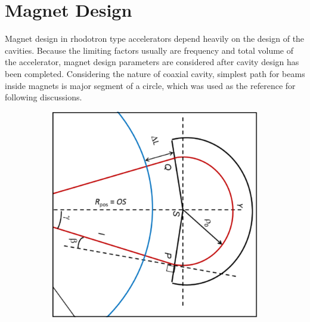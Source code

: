\documentclass[a4paper,oneside,12pt]{report}
\numberwithin{equation}{chapter}
\begin{document}
\section{Magnet Design} \label{sec:magnet_design}
Magnet design in rhodotron type accelerators depend heavily on the design of the cavities.
Because the limiting factors usually are frequency and total volume of the accelerator, magnet design parameters are considered after cavity design has been completed.
Considering the nature of coaxial cavity, simplest path for beams inside magnets is major segment of a circle, which was used as the reference for following discussions.
\iffalse \begin{figure}[H]
    \centering
    \begin{subfigure}{.5\textwidth}
      \centering
      \includegraphics[width=.9\linewidth]{./figures/design/Ltot.png}
    \end{subfigure}%
    \centering
    \begin{subfigure}{.5\textwidth}
      \centering

\end{subfigure}
\end{figure}
\end{document}
